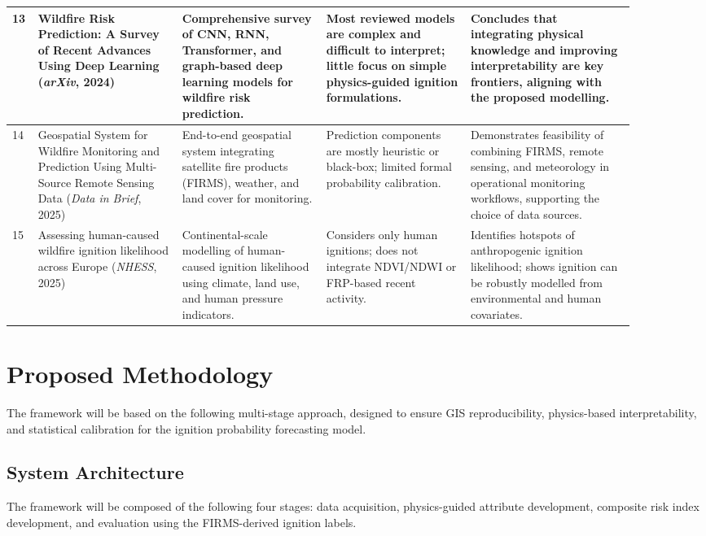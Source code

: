 \documentclass[conference]{IEEEtran}
\begin{document}
\begin{table}[t]
\begin{tabular}{|p{0.02\linewidth}|p{0.21\linewidth}|p{0.21\linewidth}|p{0.21\linewidth}|p{0.24\linewidth}|}
\hline
13 &
Wildfire Risk Prediction: A Survey of Recent Advances Using Deep Learning
(\textit{arXiv}, 2024) &
Comprehensive survey of CNN, RNN, Transformer, and graph-based deep learning models for wildfire risk prediction. &
Most reviewed models are complex and difficult to interpret; little focus on simple physics-guided ignition formulations. &
Concludes that integrating physical knowledge and improving interpretability are key frontiers, aligning with the proposed modelling. \\
\hline
14 &
Geospatial System for Wildfire Monitoring and Prediction Using Multi-Source Remote Sensing Data
(\textit{Data in Brief}, 2025) &
End-to-end geospatial system integrating satellite fire products (FIRMS), weather, and land cover for monitoring. &
Prediction components are mostly heuristic or black-box; limited formal probability calibration. &
Demonstrates feasibility of combining FIRMS, remote sensing, and meteorology in operational monitoring workflows, supporting the choice of data sources. \\
\hline
15 &
Assessing human-caused wildfire ignition likelihood across Europe
(\textit{NHESS}, 2025) &
Continental-scale modelling of human-caused ignition likelihood using climate, land use, and human pressure indicators. &
Considers only human ignitions; does not integrate NDVI/NDWI or FRP-based recent activity. &
Identifies hotspots of anthropogenic ignition likelihood; shows ignition can be robustly modelled from environmental and human covariates. \\
\hline
\end{tabular}
\end{table}

\section{Proposed Methodology}

The framework will be based on the following multi-stage approach, designed to ensure GIS reproducibility, physics-based interpretability, and statistical calibration for the ignition probability forecasting model.

\subsection{System Architecture}

The framework will be composed of the following four stages: data acquisition, physics-guided attribute development, composite risk index development, and evaluation using the FIRMS-derived ignition labels.
\end{document}
